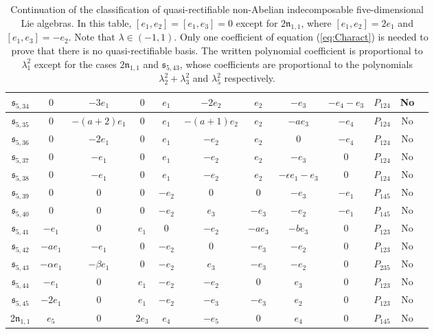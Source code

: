 \documentclass[12pt]{article}
\theoremstyle{plain}
\theoremstyle{definition}
\numberwithin{equation}{section}
\begin{document}
\begin{landscape}
{\begin{table}[ht]
{\begin{tabular}{|c|c|c|c|c|c|c|c|c|c|c|c|}
             $\mathfrak{s}_{5,34} $ &  $0$ & $-3e_1$ &$0$&$e_1$&$-2e_2$&$e_2$&$-e_3$&$-e_4-e_3$&$P_{124}$& No\\\hline
             $\mathfrak{s}_{5,35} $ & $0$ & $-(a+2)e_1$ &$0$&$e_1$&$-(a+1)e_2$&$e_2$&$-ae_3$&$-e_4$&$P_{124}$& No\\\hline
             $\mathfrak{s}_{5,36} $ &  $0$ & $-2e_1$ &$0$&$e_1$&$-e_2$&$e_2$&$0$&$-e_4$&$P_{124}$& No\\\hline
             $\mathfrak{s}_{5,37} $ &  $0$ & $-e_1$ &$0$&$e_1$&$-e_2$&$e_2$&$-e_3$&$0$&$P_{124}$& No\\\hline
             $\mathfrak{s}_{5,38} $ & $0$ & $-e_1$ &$0$&$e_1$&$-e_2$&$e_2$&$-\epsilon e_1-e_3$&$0$&$P_{124}$& No\\\hline
               $\mathfrak{s}_{5,39} $ & $0$ & $0$ &$0$&$-e_2$&$0$&$0$&$-e_3$&$-e_1$&$P_{145}$& No\\\hline
             $\mathfrak{s}_{5,40} $ &  $0$ & $0$ &$0$&$-e_2$&$e_3$&$-e_3$&$-e_2$&$-e_1$&$P_{145}$& No\\\hline
             $\mathfrak{s}_{5,41} $ &$-e_1$ & $0$ &$e_1$&$0$&$-e_2$&$-ae_3$&$-be_3$&$0$&$P_{123}$& No\\\hline
             $\mathfrak{s}_{5,42} $ &  $-ae_1$ & $-e_1$ &0&$-e_2$&$0$&$-e_3$&$-e_2$&$0$&$P_{123}$& No\\\hline
             $\mathfrak{s}_{5,43} $ &  $-\alpha e_1$ & $-\beta e_1$ &$0$&$-e_2$&$e_3$&$-e_3$&$-e_2$&$0$&$P_{235}$& No\\\hline
             $\mathfrak{s}_{5,44} $ &  $-e_1$ & $0$ &$e_1$&$-e_2$&$-e_2$&$0$&$e_3$&$0$&$P_{123}$& No\\\hline
             $\mathfrak{s}_{5,45} $ &  $-2e_1$ & $0$ &$e_1$&$-e_2$&$-e_3$&$-e_3$&$e_2$&$0$&$P_{123}$& No\\\hline
             2$\mathfrak{n}_{1,1} $ &  $e_5$ & $0$ &$2e_3$&$e_4$&$-e_5$&$0$&$e_4$&$0$&$P_{145}$& No\\\hline
    \end{tabular}
    \caption{Continuation of the classification of quasi-rectifiable non-Abelian indecomposable five-dimensional Lie algebras. In this table, $[e_1,e_2]=[e_1,e_3]=0$ except for $2\mathfrak{n}_{1,1}$, where $[e_1,e_2]=2e_1$ and $[e_1,e_3]=-e_2$. Note that $\lambda\in (-1,1).$ Only one coefficient of equation (\ref{eq:Charact}) is needed to prove that there is no quasi-rectifiable basis. The written polynomial coefficient is proportional to $\lambda_1^2$ except for the cases $2\mathfrak{n}_{1,1}$ and $\mathfrak{s}_{5,43}$, whose coefficients are proportional to the polynomials $\lambda_2^2+\lambda_3^2$ and $\lambda_5^2$ respectively.}
    \label{fig:Lie-algebra-classification6}}
\end{table}}
\end{landscape}
\end{document}

